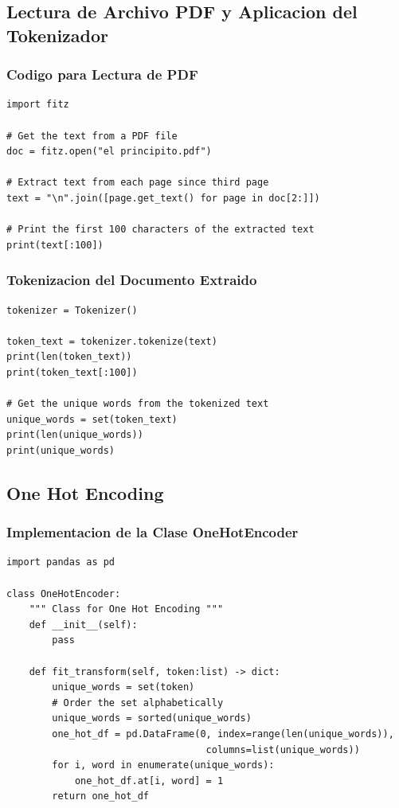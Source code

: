 \documentclass[12pt,a4paper]{article}
\begin{document}
\subsection{Lectura de Archivo PDF y Aplicacion del Tokenizador}

\subsubsection{Codigo para Lectura de PDF}

\begin{lstlisting}[caption=Extracción de texto desde PDF]
import fitz

# Get the text from a PDF file
doc = fitz.open("el principito.pdf")

# Extract text from each page since third page
text = "\n".join([page.get_text() for page in doc[2:]])  

# Print the first 100 characters of the extracted text
print(text[:100])
\end{lstlisting}

\subsubsection{Tokenizacion del Documento Extraido}

\begin{lstlisting}[caption=Tokenización del texto extraído]
tokenizer = Tokenizer()

token_text = tokenizer.tokenize(text)
print(len(token_text)) 
print(token_text[:100])

# Get the unique words from the tokenized text
unique_words = set(token_text)
print(len(unique_words))
print(unique_words)
\end{lstlisting}

\subsection{One Hot Encoding}

\subsubsection{Implementacion de la Clase OneHotEncoder}

\begin{lstlisting}[caption=Clase OneHotEncoder]
import pandas as pd

class OneHotEncoder:
    """ Class for One Hot Encoding """
    def __init__(self):
        pass
    
    def fit_transform(self, token:list) -> dict:
        unique_words = set(token)
        # Order the set alphabetically
        unique_words = sorted(unique_words)
        one_hot_df = pd.DataFrame(0, index=range(len(unique_words)), 
                                   columns=list(unique_words))
        for i, word in enumerate(unique_words):
            one_hot_df.at[i, word] = 1
        return one_hot_df
\end{lstlisting}
\end{document}
